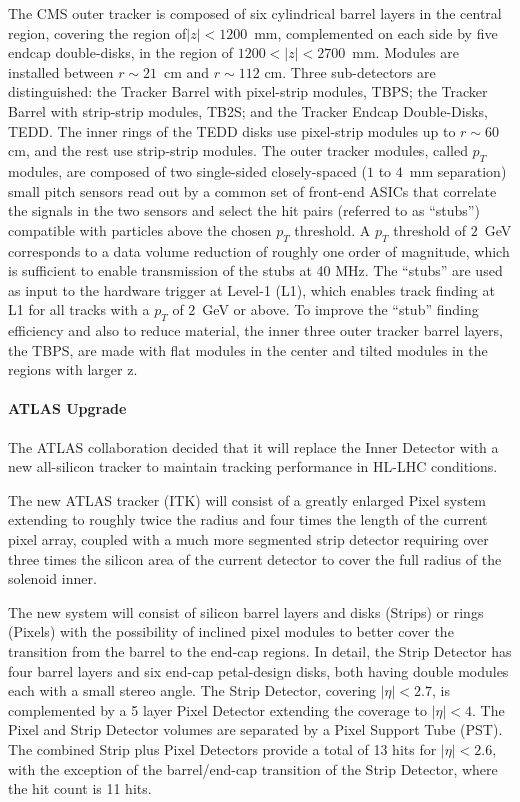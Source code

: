 The CMS outer tracker is composed of six cylindrical barrel layers in the central region, covering the region of$|z| < 1200$~mm, complemented on each side by five endcap double-disks, in
the region of $1200 < |z| < 2700$~mm. Modules are installed between $r\sim21$~cm and $r\sim112$ cm. Three sub-detectors are distinguished: the Tracker Barrel with pixel-strip modules, TBPS; the Tracker Barrel with strip-strip modules, TB2S; and the Tracker Endcap
Double-Disks, TEDD. The inner rings of the TEDD disks use pixel-strip modules up to $r\sim 60$ cm, and the rest use strip-strip modules.
The outer tracker modules, called $p_T$ modules, are composed of two single-sided closely-spaced ($1$ to $4$~mm separation) small pitch sensors read out by a common set of front-end ASICs that correlate the signals in the two sensors and select the hit pairs (referred to as ``stubs”) compatible with particles above the chosen $p_T$ threshold. A $p_T$ threshold of $2$~GeV corresponds to a data volume reduction of roughly one order of magnitude, which is sufficient to enable transmission of the stubs at 40 MHz.
The ``stubs'' are used as input to the hardware trigger at Level-1 (L1), which enables track finding at L1 for all tracks with a $p_T$ of $2$~GeV or above. 
To improve the ``stub'' finding efficiency and also to reduce material, the inner three outer tracker barrel layers, the TBPS, are made with flat modules in the center and tilted modules in the regions with larger z. 

\paragraph{ATLAS Upgrade}
The ATLAS collaboration decided that it will replace the Inner Detector with a new all-silicon tracker to maintain tracking performance in
HL-LHC conditions.

The new ATLAS tracker (ITK) will consist of a greatly enlarged
Pixel system extending to roughly twice the radius and four times the length of the current
pixel array, coupled with a much more segmented strip detector requiring over three
times the silicon area of the current detector to cover the full radius of the solenoid inner.

The new system will consist of silicon barrel layers and disks (Strips) or rings
(Pixels) with the possibility of inclined pixel modules to better cover the transition from
the barrel to the end-cap regions.
In detail, the Strip Detector has four barrel layers and six end-cap petal-design disks, both having double modules each with a small stereo angle.
The Strip Detector, covering $|\eta|< 2.7$,
is complemented by a 5 layer Pixel Detector extending the coverage to $|\eta |< 4$. The Pixel
and Strip Detector volumes are separated by a Pixel Support Tube (PST).
The combined Strip plus Pixel Detectors provide a total of 13 hits for $|\eta| < 2.6$, with
the exception of the barrel/end-cap transition of the Strip Detector, where the hit count is 11 hits.


